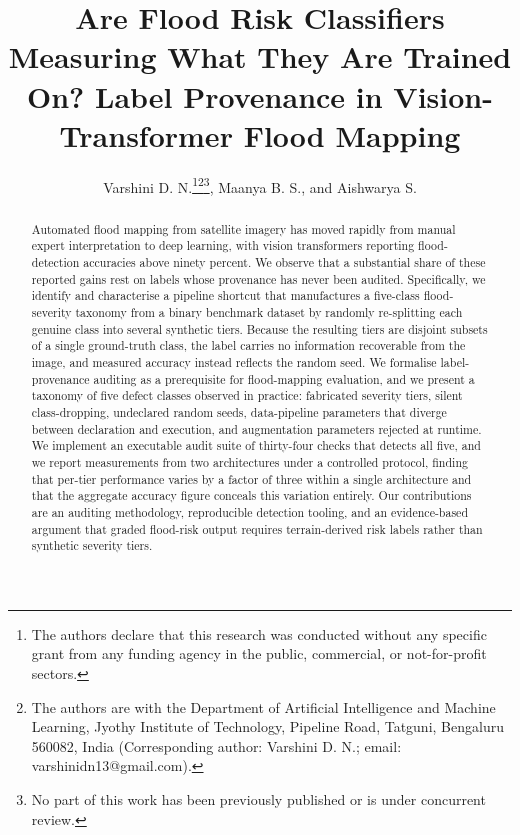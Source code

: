 \documentclass[11pt,journal]{IEEEtran}
\begin{document}
\title{Are Flood Risk Classifiers Measuring What They Are
Trained On? Label Provenance in Vision-Transformer Flood Mapping}

\author{Varshini D. N.\thanks{The authors declare that this research was conducted without any specific grant from any funding agency in the public, commercial, or not-for-profit sectors.}\thanks{The authors are with the Department of Artificial Intelligence and Machine Learning, Jyothy Institute of Technology, Pipeline Road, Tatguni, Bengaluru 560082, India (Corresponding author: Varshini D. N.; email: varshinidn13@gmail.com).}\thanks{No part of this work has been previously published or is under concurrent review.},
Maanya B. S., and Aishwarya S.}

\maketitle

\begin{abstract}
Automated flood mapping from satellite imagery has moved rapidly from manual
expert interpretation to deep learning, with vision transformers reporting
flood-detection accuracies above ninety percent. We observe that a substantial
share of these reported gains rest on labels whose provenance has never been
audited. Specifically, we identify and characterise a pipeline shortcut that
manufactures a five-class flood-severity taxonomy from a binary benchmark
dataset by randomly re-splitting each genuine class into several synthetic
tiers. Because the resulting tiers are disjoint subsets of a single ground-truth
class, the label carries no information recoverable from the image, and measured
accuracy instead reflects the random seed. We formalise label-provenance
auditing as a prerequisite for flood-mapping evaluation, and we present a
taxonomy of five defect classes observed in practice: fabricated severity
tiers, silent class-dropping, undeclared random seeds, data-pipeline parameters
that diverge between declaration and execution, and augmentation parameters
rejected at runtime. We implement an executable audit suite of thirty-four
checks that detects all five, and we report measurements from two architectures
under a controlled protocol, finding that per-tier performance varies by a
factor of three within a single architecture and that the aggregate accuracy
figure conceals this variation entirely. Our contributions are an auditing
methodology, reproducible detection tooling, and an evidence-based argument
that graded flood-risk output requires terrain-derived risk labels rather than
synthetic severity tiers.
\end{abstract}
\end{document}
